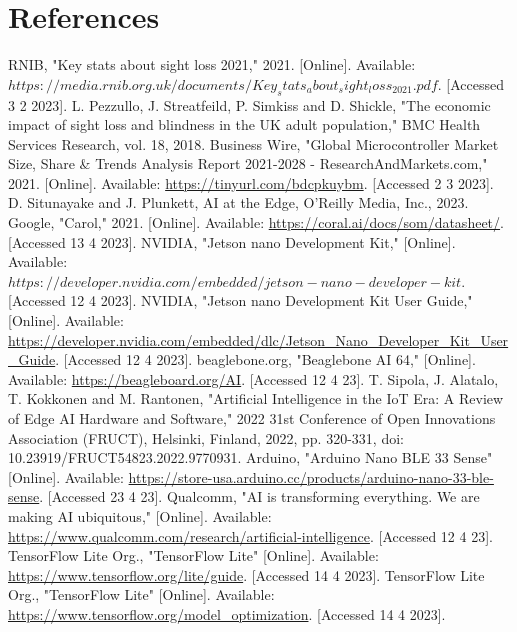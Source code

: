 \documentclass[conference]{IEEEtran}
\begin{document}


\section*{References}
\begin{thebibliography}{00}
 RNIB, "Key stats about sight loss 2021," 2021. [Online]. Available: $https://media.rnib.org.uk/documents/Key_stats_about_sight_loss_2021.pdf.$ [Accessed 3 2 2023].
 L. Pezzullo, J. Streatfeild, P. Simkiss and D. Shickle, "The economic impact of sight loss and blindness in the UK adult population," BMC Health Services Research, vol. 18, 2018. 
 Business Wire, "Global Microcontroller Market Size, Share \& Trends Analysis Report 2021-2028 - ResearchAndMarkets.com," 2021. [Online]. Available: \url{https://tinyurl.com/bdcpkuybm}. [Accessed 2 3 2023].
 D. Situnayake and J. Plunkett, AI at the Edge, O'Reilly Media, Inc., 2023. 
 Google, "Carol," 2021. [Online]. Available: \url{https://coral.ai/docs/som/datasheet/}. [Accessed 13 4 2023].
 NVIDIA, "Jetson nano Development Kit," [Online]. Available: $https://developer.nvidia.com/embedded/jetson-nano-developer-kit$. [Accessed 12 4 2023].
 NVIDIA, "Jetson nano Development Kit User Guide," [Online]. Available: \url{https://developer.nvidia.com/embedded/dlc/Jetson_Nano_Developer_Kit_User_Guide}. [Accessed 12 4 2023].
 beaglebone.org, "Beaglebone AI 64," [Online]. Available: \url{https://beagleboard.org/AI}. [Accessed 12 4 23].
 T. Sipola, J. Alatalo, T. Kokkonen and M. Rantonen, "Artificial Intelligence in the IoT Era: A Review of Edge AI Hardware and Software," 2022 31st Conference of Open Innovations Association (FRUCT), Helsinki, Finland, 2022, pp. 320-331, doi: 10.23919/FRUCT54823.2022.9770931.
 Arduino, "Arduino Nano BLE 33 Sense" [Online]. Available: \url{https://store-usa.arduino.cc/products/arduino-nano-33-ble-sense}. [Accessed 23 4 23].
 Qualcomm, "AI is transforming everything. We are making AI ubiquitous," [Online]. Available: \url{https://www.qualcomm.com/research/artificial-intelligence}. [Accessed 12 4 23].
 TensorFlow Lite Org., "TensorFlow Lite" [Online]. Available: \url{https://www.tensorflow.org/lite/guide}. [Accessed 14 4 2023].
 TensorFlow Lite Org., "TensorFlow Lite" [Online]. Available: \url{https://www.tensorflow.org/model_optimization}. [Accessed 14 4 2023].

\end{thebibliography}
\end{document}
